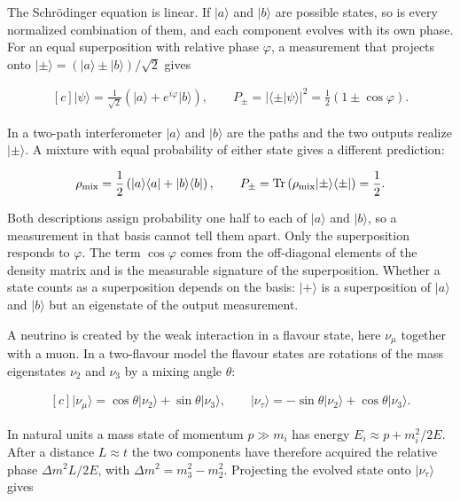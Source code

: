 \documentclass[11pt,oneside]{book}
\newenvironment{centeredalign}{\[\begin{gathered}[c]}{\end{gathered}\]}
\newcommand{\ket}[1]{\lvert #1\rangle}
\newcommand{\bra}[1]{\langle #1\rvert}
\begin{document}
The Schrödinger equation is linear. If \(\ket a\) and \(\ket b\) are possible states, so is every normalized combination of them, and each component evolves with its own phase. For an equal superposition with relative phase \(\varphi\), a measurement that projects onto \(\ket\pm=(\ket a\pm\ket b)/\sqrt2\) gives

\begin{centeredalign}
\ket\psi=\frac{1}{\sqrt2}\left(\ket a+e^{i\varphi}\ket b\right),\qquad
P_\pm=|\langle\pm|\psi\rangle|^2=\frac12\left(1\pm\cos\varphi\right).
\end{centeredalign}

In a two-path interferometer \(\ket a\) and \(\ket b\) are the paths and the two outputs realize \(\ket\pm\). A mixture with equal probability of either state gives a different prediction:

\begin{centeredalign}
\rho_{\rm mix}=\frac12\left(\ket a\bra a+\ket b\bra b\right),\qquad
P_\pm=\operatorname{Tr}\left(\rho_{\rm mix}\ket\pm\bra\pm\right)=\frac12.
\end{centeredalign}

Both descriptions assign probability one half to each of \(\ket a\) and \(\ket b\), so a measurement in that basis cannot tell them apart. Only the superposition responds to \(\varphi\). The term \(\cos\varphi\) comes from the off-diagonal elements of the density matrix and is the measurable signature of the superposition. Whether a state counts as a superposition depends on the basis: \(\ket+\) is a superposition of \(\ket a\) and \(\ket b\) but an eigenstate of the output measurement.

A neutrino is created by the weak interaction in a flavour state, here \(\nu_\mu\) together with a muon. In a two-flavour model the flavour states are rotations of the mass eigenstates \(\nu_2\) and \(\nu_3\) by a mixing angle \(\theta\):

\begin{centeredalign}
\ket{\nu_\mu}=\cos\theta\ket{\nu_2}+\sin\theta\ket{\nu_3},\qquad
\ket{\nu_\tau}=-\sin\theta\ket{\nu_2}+\cos\theta\ket{\nu_3}.
\end{centeredalign}

In natural units a mass state of momentum \(p\gg m_i\) has energy \(E_i\approx p+m_i^2/2E\). After a distance \(L\approx t\) the two components have therefore acquired the relative phase \(\Delta m^2L/2E\), with \(\Delta m^2=m_3^2-m_2^2\). Projecting the evolved state onto \(\ket{\nu_\tau}\) gives
\end{document}
